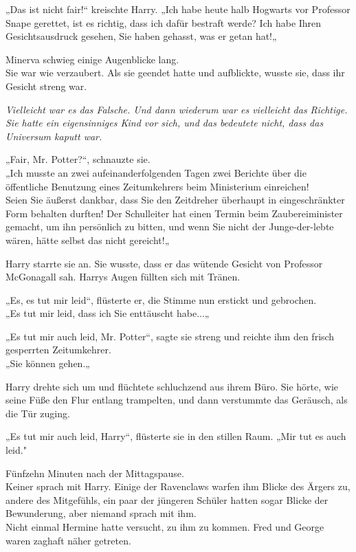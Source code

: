 {„Das ist nicht fair!“ kreischte Harry. „Ich habe heute halb Hogwarts vor Professor Snape gerettet, ist es richtig, dass ich dafür bestraft werde? Ich habe Ihren Gesichtsausdruck gesehen, Sie haben gehasst, was er getan hat!„

Minerva schwieg einige Augenblicke lang.\\ Sie war wie verzaubert. Als sie geendet hatte und aufblickte, wusste sie, dass ihr Gesicht streng war.

\emph{Vielleicht war es das Falsche. Und dann wiederum war es vielleicht das Richtige. Sie hatte ein eigensinniges Kind vor sich, und das bedeutete nicht, dass das Universum kaputt war.}

„Fair, Mr. Potter?“, schnauzte sie.\\ „Ich musste an zwei aufeinanderfolgenden Tagen zwei Berichte über die öffentliche Benutzung eines Zeitumkehrers beim Ministerium einreichen!\\ Seien Sie äußerst dankbar, dass Sie den Zeitdreher überhaupt in eingeschränkter Form behalten durften! Der Schulleiter hat einen Termin beim Zaubereiminister gemacht, um ihn persönlich zu bitten, und wenn Sie nicht der Junge-der-lebte wären, hätte selbst das nicht gereicht!„

Harry starrte sie an. Sie wusste, dass er das wütende Gesicht von Professor McGonagall sah. Harrys Augen füllten sich mit Tränen.

„Es, es tut mir leid“, flüsterte er, die Stimme nun erstickt und gebrochen.\\ „Es tut mir leid, dass ich Sie enttäuscht habe...„

„Es tut mir auch leid, Mr. Potter“, sagte sie streng und reichte ihm den frisch gesperrten Zeitumkehrer.\\ „Sie können gehen.„

Harry drehte sich um und flüchtete schluchzend aus ihrem Büro. Sie hörte, wie seine Füße den Flur entlang trampelten, und dann verstummte das Geräusch, als die Tür zuging.

„Es tut mir auch leid, Harry“, flüsterte sie in den stillen Raum. „Mir tut es auch leid."

Fünfzehn Minuten nach der Mittagspause.\\ Keiner sprach mit Harry. Einige der Ravenclaws warfen ihm Blicke des Ärgers zu, andere des Mitgefühls, ein paar der jüngeren Schüler hatten sogar Blicke der Bewunderung, aber niemand sprach mit ihm.\\ Nicht einmal Hermine hatte versucht, zu ihm zu kommen. Fred und George waren zaghaft näher getreten.

}
